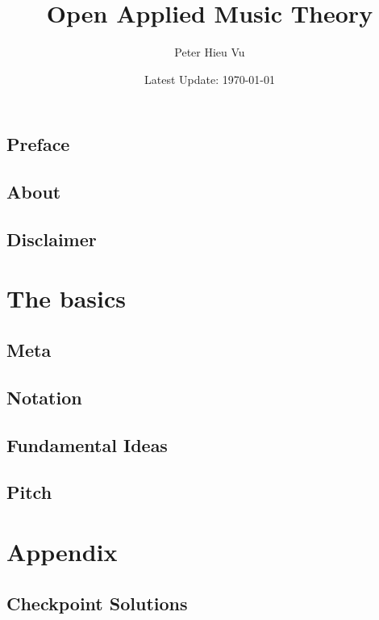 \documentclass[12pt]{book}
\title{Open Applied Music Theory}
\author{Peter Hieu Vu}
\date{Latest Update: \today}
\renewcommand{\chaptermark}[1]{ \markboth{#1}{} }
\renewcommand{\sectionmark}[1]{ \markright{#1}{} }
\newcommand\onlyinsubfile[1]{#1}
\newcommand\notinsubfile[1]{}
\begin{document}
\renewcommand{\onlyinsubfile}[1]{}
\renewcommand{\notinsubfile}[1]{#1}

    \maketitle
    
    \frontmatter
    \chapter{Preface}\label{preface}
    
    
    \chapter{About}\label{about}
    
    
    \tableofcontents
    
    \chapter{Disclaimer}\label{disclaimer}
    
    
    \mainmatter
    \setcounter{chapter}{-1}
    \renewcommand{\chaptermark}[1]{ \markboth{Ch.\thechapter\enspace #1}{} }
    \renewcommand{\sectionmark}[1]{ \markright{\thesection\enspace #1}{} }
    
    \part{The basics}

        \chapter{Meta}\label{ch0}
            

        \chapter{Notation}\label{ch1}
            
            
        \chapter{Fundamental Ideas}\label{ch2}
            

        \chapter{Pitch}\label{ch3}
            
    
    \part{Appendix}


        \chapter*{Checkpoint Solutions}\label{checkpoints}
            
\end{document}
